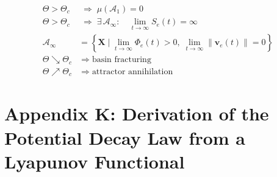 \documentclass[11pt,oneside]{article}
\begin{document}
\begin{align}
\Theta > \Theta_c
&\;\Longrightarrow\;
\mu(\mathcal{A}_1) = 0
\\[14pt]

\Theta > \Theta_c
&\;\Longrightarrow\;
\exists\, \mathcal{A}_\infty :
\quad
\lim_{t \to \infty} S_e(t) = \infty
\\[14pt]

\mathcal{A}_\infty
&=
\left\{
\mathbf{X} \mid
\lim_{t \to \infty}
\Phi_e(t) > 0,\;
\lim_{t \to \infty}
\|\mathbf{v}_e(t)\| = 0
\right\}
\\[14pt]

\Theta \searrow \Theta_c
&\;\Longrightarrow\;
\text{basin fracturing}
\\[10pt]

\Theta \nearrow \Theta_c
&\;\Longrightarrow\;
\text{attractor annihilation}
\end{align}

\section{Appendix K: Derivation of the Potential Decay Law from a Lyapunov Functional}
\end{document}
